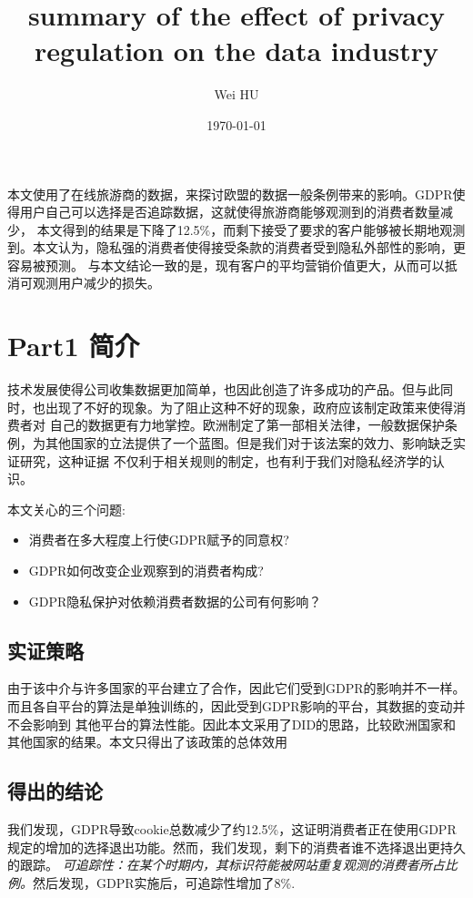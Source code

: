 \documentclass{article}
\begin{document}
\author{Wei HU}
\title{summary of the effect of privacy regulation on the data industry}
\date{\today}
\maketitle

本文使用了在线旅游商的数据，来探讨欧盟的数据一般条例带来的影响。GDPR使得用户自己可以选择是否追踪数据，这就使得旅游商能够观测到的消费者数量减少，
本文得到的结果是下降了12.5\%，而剩下接受了要求的客户能够被长期地观测到。本文认为，隐私强的消费者使得接受条款的消费者受到隐私外部性的影响，更容易被预测。
与本文结论一致的是，现有客户的平均营销价值更大，从而可以抵消可观测用户减少的损失。

\section*{Part1 简介}
技术发展使得公司收集数据更加简单，也因此创造了许多成功的产品。但与此同时，也出现了不好的现象。为了阻止这种不好的现象，政府应该制定政策来使得消费者对
自己的数据更有力地掌控。欧洲制定了第一部相关法律，一般数据保护条例，为其他国家的立法提供了一个蓝图。但是我们对于该法案的效力、影响缺乏实证研究，这种证据
不仅利于相关规则的制定，也有利于我们对隐私经济学的认识。

本文关心的三个问题:
\begin{itemize}
    \item 消费者在多大程度上行使GDPR赋予的同意权?
    \item GDPR如何改变企业观察到的消费者构成?
    \item GDPR隐私保护对依赖消费者数据的公司有何影响？
\end{itemize}

\subsection*{实证策略}
由于该中介与许多国家的平台建立了合作，因此它们受到GDPR的影响并不一样。而且各自平台的算法是单独训练的，因此受到GDPR影响的平台，其数据的变动并不会影响到
其他平台的算法性能。因此本文采用了DID的思路，比较欧洲国家和其他国家的结果。本文只得出了该政策的总体效用

\subsection*{得出的结论}
我们发现，GDPR导致cookie总数减少了约12.5\%，这证明消费者正在使用GDPR规定的增加的选择退出功能。然而，我们发现，剩下的消费者谁不选择退出更持久的跟踪。
\textit{可追踪性：在某个时期内，其标识符能被网站重复观测的消费者所占比例。}然后发现，GDPR实施后，可追踪性增加了8\%.
\end{document}
